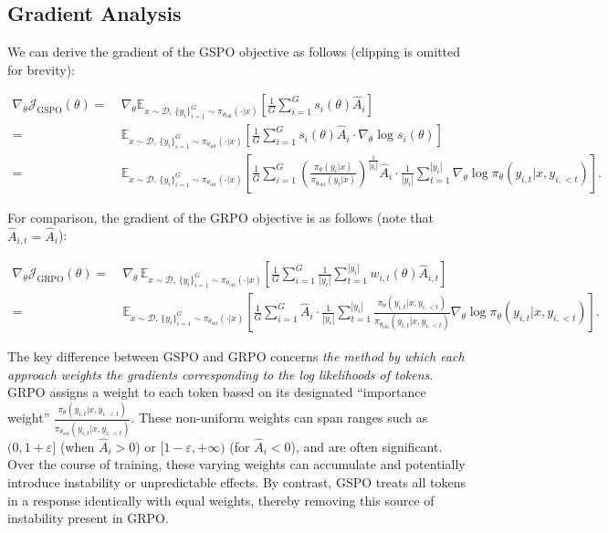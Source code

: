 \subsection{Gradient Analysis}
\label{subsec:gradient}

We can derive the gradient of the GSPO objective as follows (clipping is omitted for brevity):

\begin{align}
\nabla_{\theta} \mathcal{J}_\text{GSPO} (\theta)
=&\ 
\nabla_{\theta} \mathbb{E}_{ x \sim \mathcal{D},\, \{y_i\}_{i=1}^G \sim \pi_{\theta_\text{old}}( \cdot | x) }
\left[ 
\frac{1}{G} \sum_{i=1}^{G} s_{i}(\theta) \widehat{A}_{i}
\right] \\
= &\ 
\mathbb{E}_{ x \sim \mathcal{D},\, \{y_i\}_{i=1}^G \sim \pi_{\theta_\text{old}}( \cdot | x) }
\left[ 
\frac{1}{G} \sum_{i=1}^{G}
s_{i}(\theta) \widehat{A}_{i}
\cdot \nabla_{\theta} \log s_{i}(\theta)
\right] \\
=&\ 
\mathbb{E}_{ x \sim \mathcal{D},\, \{y_i\}_{i=1}^G \sim \pi_{\theta_\text{old}}( \cdot | x) }
\left[ 
\frac{1}{G} \sum_{i=1}^{G} 
\left( \frac{ \pi_{\theta} (y_i | x) }{ \pi_{\theta_\text{old}} (y_i | x)} \right)^{\frac{1}{|y_i|}} \widehat{A}_{i} 
\cdot \frac{1}{|y_i|} \sum_{t=1}^{|y_i|} \nabla_{\theta} \log \pi_{\theta} (y_{i,t} | x, y_{i,<t}) 
\right].
\label{equ:gspo_grad}
\end{align}

For comparison, the gradient of the GRPO objective is as follows (note that $\widehat{A}_{i,t} = \widehat{A}_{i}$):

\begin{align}
\nabla_{\theta} \mathcal{J}_\text{GRPO} (\theta) 
=&\
\nabla_{\theta} \, \mathbb{E}_{ x \sim \mathcal{D},\, \{y_i\}_{i=1}^G \sim \pi_{\theta_\text{old}}( \cdot | x) }
\left[
\frac{1}{G} \sum_{i=1}^{G} \frac{1}{|y_i|} \sum_{t=1}^{|y_i|} 
w_{i,t}(\theta) \widehat{A}_{i,t}
\right] \\
=&\
\mathbb{E}_{ x \sim \mathcal{D},\, \{y_i\}_{i=1}^G \sim \pi_{\theta_\text{old}}( \cdot | x) }
\left[
\frac{1}{G} \sum_{i=1}^G \widehat{A}_i
\cdot \frac{1}{|y_i|} \sum_{t=1}^{|y_i|} 
\frac{ \pi_{\theta} (y_{i,t} | x, y_{i,<t}) }{ \pi_{\theta_\text{old}} (y_{i,t} | x, y_{i,<t}) }
\nabla_{\theta} \log \pi_{\theta}(y_{i,t} | x, y_{i,<t})
\right].
\end{align}

The key difference between GSPO and GRPO concerns \textit{the method by which each approach weights the gradients corresponding to the log likelihoods of tokens}. GRPO assigns a weight to each token based on its designated ``importance weight'' $\frac{ \pi_{\theta} (y_{i,t} | x, y_{i,<t}) }{ \pi_{\theta_\text{old}} (y_{i,t} | x,y_{i,<t})}$. These non-uniform weights can span ranges such as $(0, 1+\varepsilon]$ (when $\widehat{A}_{i} >0$) or $[1-\varepsilon, +\infty)$ (for $\widehat{A}_{i} < 0$), and are often significant. Over the course of training, these varying weights can accumulate and potentially introduce instability or unpredictable effects. By contrast, GSPO treats all tokens in a response identically with equal weights, thereby removing this source of instability present in GRPO.

